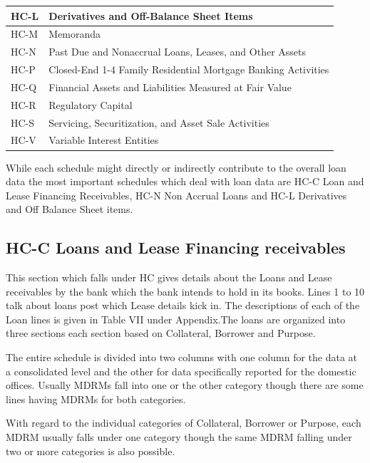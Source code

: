\documentclass[conference]{IEEEtran}
\begin{document}
\begin{table}[htbp]
\begin{tabular}{|p{1.5cm}|p{6cm}|}
    		\hline
    		HC-L & Derivatives and Off-Balance Sheet Items \\
    		\hline
    		HC-M & Memoranda \\
    		\hline
    		HC-N & Past Due and Nonaccrual Loans, Leases, and Other Assets \\
    		\hline
    		HC-P & Closed-End 1-4 Family Residential Mortgage Banking Activities \\
    		\hline
    		HC-Q & Financial Assets and Liabilities Measured at Fair Value \\
    		\hline
    		HC-R & Regulatory Capital \\
    		\hline
    		HC-S & Servicing, Securitization, and Asset Sale Activities \\
    		\hline
    		HC-V & Variable Interest Entities \\
    		\hline
    	\end{tabular}
    \end{table}
    
    
    While each schedule might directly or indirectly contribute to the overall loan data the most important schedules which deal with loan data are HC-C Loan and Lease Financing Receivables, HC-N Non Accrual Loans and HC-L Derivatives and Off Balance Sheet items. 
    
    \subsection{HC-C Loans and Lease Financing receivables}
     This section which falls under HC gives details about the Loans and Lease receivables by the bank which the bank intends to hold in its books. Lines 1 to 10 talk about loans post which Lease details kick in. The descriptions of each of the Loan lines is given in Table VII under Appendix.The loans are organized into three sections each section based on Collateral, Borrower and Purpose.
     
     The entire schedule is divided into two columns with one column for the data at a consolidated level and the other for data specifically reported for the domestic offices. Usually MDRMs fall into one or the other category though there are some lines having MDRMs for both categories.
     
     With regard to the individual categories of Collateral, Borrower or Purpose, each MDRM usually falls under one category though the same MDRM falling under two or more categories is also possible. 
     
\end{document}
